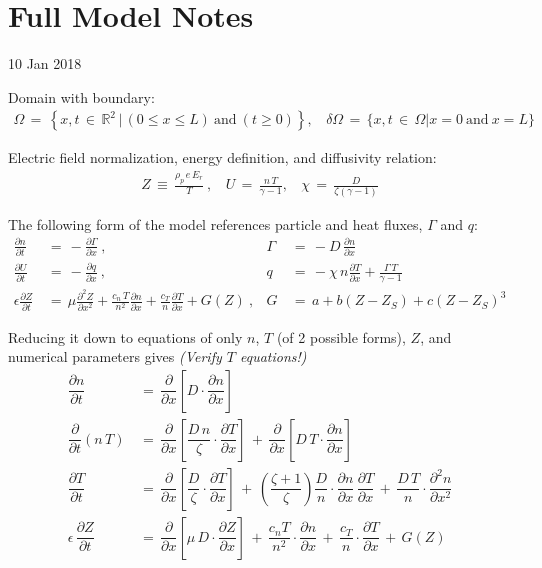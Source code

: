 \documentclass[a4paper,8pt]{article}
\date{}
\begin{document}
\hypertarget{full-model-notes}{%
\section{Full Model Notes}\label{full-model-notes}}

10 Jan 2018

Domain with boundary: \begin{align}
    \Omega \,=\, \left\{x, t \,\in\, \mathbb{R}^2 \,|\, (0 \leq x \leq L) ~\text{and}~ (t \geq 0)\right\}, ~~~~ \delta\Omega \,=\, \{x, t \,\in\, \Omega | x = 0 ~\text{and}~ x = L \}
\end{align}

Electric field normalization, energy definition, and diffusivity
relation: \begin{align}
    Z \,\equiv\, \frac{\rho_p \, e \, E_r}{T}~, ~~~~ U \,=\, \frac{n\,T}{\gamma - 1}, ~~~~ \chi \,=\, \frac{D}{\zeta(\gamma - 1)}
\end{align}

The following form of the model references particle and heat fluxes,
\(\Gamma\) and \(q\): \small\begin{align}
    \frac{\partial n}{\partial t} \,&=\, -\frac{\partial \Gamma}{\partial x}~, &\Gamma \,&=\, -D \, \frac{\partial n}{\partial x} \\
    \frac{\partial U}{\partial t} \,&=\, -\frac{\partial q}{\partial x}~, &q \,&=\, -\chi \, n \frac{\partial T}{\partial x} + \frac{\Gamma\,T}{\gamma - 1} \\
    \epsilon \frac{\partial Z}{\partial t} \,&=\, \mu \frac{\partial^2 Z}{\partial x^2} + \frac{c_n \, T}{n^2} \frac{\partial n}{\partial x} + \frac{c_T}{n} \frac{\partial T}{\partial x} + G(Z)~, &G \,&=\, a + b(Z - Z_S) + c(Z - Z_S)^3
\end{align}\normalsize

Reducing it down to equations of only \(n\), \(T\) (of 2 possible
forms), \(Z\), and numerical parameters gives \emph{(Verify \(T\)
equations!)} \small\begin{align}
    \dfrac{\partial n}{\partial t} \,&=\, \dfrac{\partial}{\partial x}\left[D \cdot \dfrac{\partial n}{\partial x}\right] \\
    \dfrac{\partial}{\partial t}(n\,T) \,&=\, \dfrac{\partial}{\partial x}\left[\dfrac{D\,n}{\zeta} \cdot \dfrac{\partial T}{\partial x}\right] \,+\, \dfrac{\partial}{\partial x}\left[D\,T \cdot \dfrac{\partial n}{\partial x}\right] \\
    \dfrac{\partial T}{\partial t} \,&=\, \dfrac{\partial}{\partial x}\left[\dfrac{D}{\zeta} \cdot \dfrac{\partial T}{\partial x}\right] \,+\, \left(\dfrac{\zeta + 1}{\zeta}\right) \dfrac{D}{n} \cdot \dfrac{\partial n}{\partial x} \, \dfrac{\partial T}{\partial x} \,+\, \dfrac{D\,T}{n} \cdot \dfrac{\partial ^2 n}{\partial x^2} \\
    \epsilon \, \dfrac{\partial Z}{\partial t} \,&=\, \dfrac{\partial}{\partial x}\left[\mu\,D \cdot \dfrac{\partial Z}{\partial x}\right] \,+\, \dfrac{c_n T}{n^2} \cdot \dfrac{\partial n}{\partial x} \,+\, \dfrac{c_T}{n} \cdot \dfrac{\partial T}{\partial x} \,+\, G(Z)
\end{align}\normalsize
\end{document}
